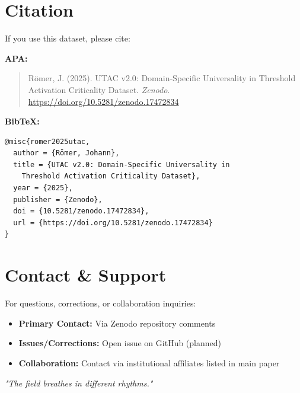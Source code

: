 \documentclass[11pt,a4paper]{article}
\begin{document}
\section{Citation}

If you use this dataset, please cite:

\textbf{APA:}
\begin{quote}
Römer, J. (2025). UTAC v2.0: Domain-Specific Universality in Threshold Activation Criticality Dataset. \textit{Zenodo}. \url{https://doi.org/10.5281/zenodo.17472834}
\end{quote}

\textbf{BibTeX:}
\begin{verbatim}
@misc{romer2025utac,
  author = {Römer, Johann},
  title = {UTAC v2.0: Domain-Specific Universality in 
    Threshold Activation Criticality Dataset},
  year = {2025},
  publisher = {Zenodo},
  doi = {10.5281/zenodo.17472834},
  url = {https://doi.org/10.5281/zenodo.17472834}
}
\end{verbatim}

\section{Contact \& Support}

For questions, corrections, or collaboration inquiries:

\begin{itemize}
\item \textbf{Primary Contact:} Via Zenodo repository comments
\item \textbf{Issues/Corrections:} Open issue on GitHub (planned)
\item \textbf{Collaboration:} Contact via institutional affiliates listed in main paper
\end{itemize}

\vspace{2em}

\begin{center}
\textit{"The field breathes in different rhythms."}
\end{center}
\end{document}
